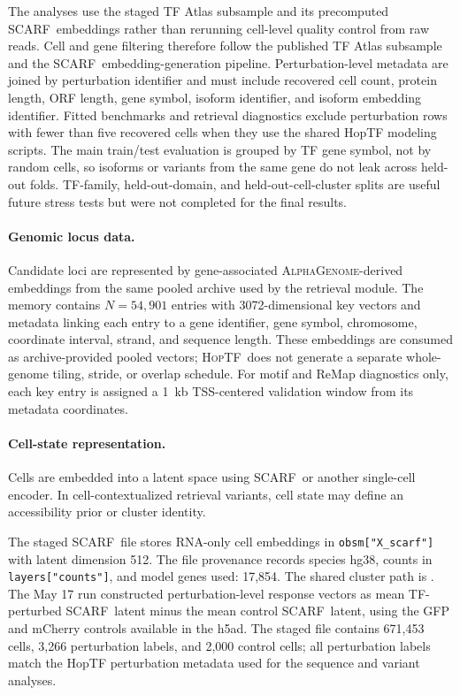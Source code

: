 \documentclass[11pt]{article}
\newcommand{\hoptf}{\textsc{HopTF}}
\newcommand{\ag}{\textsc{AlphaGenome}}
\newcommand{\scarf}{\textsc{SCARF}}
\begin{document}
The analyses use the staged TF Atlas subsample and its precomputed \scarf\ embeddings rather than rerunning cell-level quality control from raw reads. Cell and gene filtering therefore follow the published TF Atlas subsample and the \scarf\ embedding-generation pipeline. Perturbation-level metadata are joined by perturbation identifier and must include recovered cell count, protein length, ORF length, gene symbol, isoform identifier, and isoform embedding identifier. Fitted benchmarks and retrieval diagnostics exclude perturbation rows with fewer than five recovered cells when they use the shared HopTF modeling scripts. The main train/test evaluation is grouped by TF gene symbol, not by random cells, so isoforms or variants from the same gene do not leak across held-out folds. TF-family, held-out-domain, and held-out-cell-cluster splits are useful future stress tests but were not completed for the final results.

\paragraph{Genomic locus data.}
Candidate loci are represented by gene-associated \ag-derived embeddings from the same pooled archive used by the retrieval module. The memory contains \(N=54{,}901\) entries with 3072-dimensional key vectors and metadata linking each entry to a gene identifier, gene symbol, chromosome, coordinate interval, strand, and sequence length. These embeddings are consumed as archive-provided pooled vectors; \hoptf\ does not generate a separate whole-genome tiling, stride, or overlap schedule. For motif and ReMap diagnostics only, each key entry is assigned a 1~kb TSS-centered validation window from its metadata coordinates.

\paragraph{Cell-state representation.}
Cells are embedded into a latent space using \scarf\ or another single-cell encoder. In cell-contextualized retrieval variants, cell state may define an accessibility prior or cluster identity.

The staged \scarf\ file stores RNA-only cell embeddings in \texttt{obsm["X\_scarf"]} with latent dimension 512. The file provenance records species hg38, counts in \texttt{layers["counts"]}, and model genes used: 17,854. The shared cluster path is . The May 17 run constructed perturbation-level response vectors as mean TF-perturbed \scarf\ latent minus the mean control \scarf\ latent, using the GFP and mCherry controls available in the h5ad. The staged file contains 671,453 cells, 3,266 perturbation labels, and 2,000 control cells; all perturbation labels match the HopTF perturbation metadata used for the sequence and variant analyses.
\end{document}
